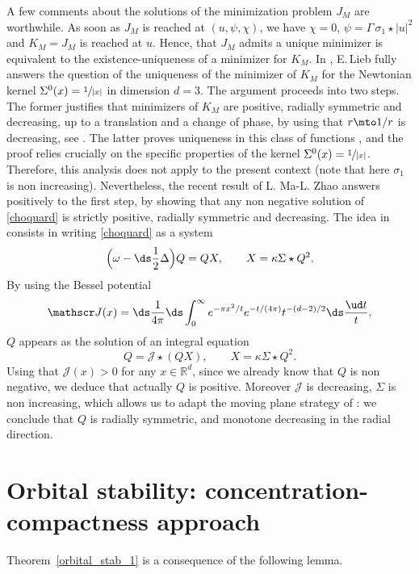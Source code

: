 A few comments about the solutions of the minimization problem $J_{M}$ are worthwhile.
As soon as $J_{M}$ is reached at $(u,\psi,\chi)$,
we have
$\chi=0$, $\psi=\Gamma\,\sigma_{1}\star|u|^{2}$ and $K_{M}=J_{M}$ is reached at $u$. Hence, that $J_{M}$ admits a unique minimizer is equivalent to the existence-uniqueness of a minimizer for $K_{M}$.
In \cite{Lieb_Choquard}, E.\,Lieb fully answers the question of the uniqueness of the minimizer of $K_{M}$ for the Newtonian kernel $\Sigma^0(x)=\sfrac{1}{|x|}$ in dimension $d=3$.
The argument proceeds into
two steps.
The former justifies
that minimizers of $K_M$ are positive, radially symmetric and decreasing, up to a translation and a change of phase,
by using that $r\mto 1/r$ is decreasing, see \cite[Lem.\,3 \& Cor.\,4]{Lieb_Choquard}.
The latter proves uniqueness in this class of functions \cite[Th.\,10]{Lieb_Choquard},
and the proof relies crucially on the specific properties of the kernel $\Sigma^0(x)=\sfrac{1}{|x|}$.
Therefore, this analysis does not apply to the present context (note that here $\sigma_{1}$ is non increasing).
Nevertheless, the recent result of L. Ma-L. Zhao \cite[\S 5]{MaZ}
answers positively to the first step, by showing that any non negative solution of \eqref{choquard} is strictly positive, radially symmetric and decreasing.
The idea in \cite{MaZ} consists in writing \eqref{choquard} as a system
\[
\Big(\omega -\ds\frac{1}{2}\Delta\Big) Q= Q X,\qquad X= \kappa\Sigma\star Q^2.
\]
By using the Bessel potential \cite[Chap.\,V, \S3]{Stein}
\[
\mathscr J(x)=\ds\frac{1}{4\pi}\ds\int_0^\infty e^{-\pi x^2/ t}e^{-t/(4\pi)} t^{-(d-2)/2}\ds\frac{\ud t}{t},
\]
$Q$ appears as the solution of an integral equation
\[
Q=\mathscr J\star (QX),\qquad X= \kappa\Sigma\star Q^2.
\]
Using
that $ \mathscr J(x)>0$ for any $x\in\mathbb R^d$,
since we already know that $Q$ is non negative, we deduce that actually $Q$ is positive.
Moreover $\mathscr J$ is decreasing, $\Sigma$ is non increasing, which allows us to adapt the moving plane strategy of
\cite[Th.\,2 \& \S3]{MaZ}: we conclude that $Q$ is radially symmetric,
and monotone decreasing in the radial direction.

\section{Orbital stability: concentration-compactness approach}
\label{OrbitalStability1}

Theorem~\ref{orbital_stab_1} is a consequence of the following lemma.

